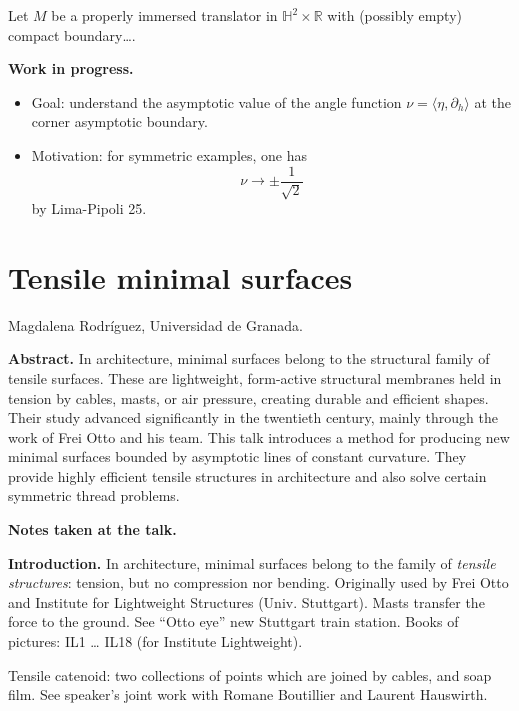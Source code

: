 \begin{theorem}
\label{theorem-pdst25}
Let $M$ be a properly immersed translator in
$\mathbb{H}^2 \times \mathbb{R}$ with
(possibly empty) compact boundary….
\end{theorem}


\medskip\noindent
{\bf Work in progress.}

\begin{itemize}
\item Goal: understand the asymptotic value
of the angle function $\nu =
\langle\eta,\partial_h\rangle$ at the corner
asymptotic boundary.
\item Motivation: for symmetric examples,
one has
$$
\nu \to \pm \frac{1}{\sqrt{2}}
$$
by Lima-Pipoli 25.
\end{itemize}

\section{Tensile minimal surfaces}
\label{section-tensile-minimal-surfaces}

\medskip\noindent
Magdalena Rodr\'iguez,
Universidad de Granada.

\medskip\noindent
{\bf Abstract.}
In architecture, minimal surfaces belong
to the structural family of tensile
surfaces. These are lightweight,
form-active structural membranes held in
tension by cables, masts, or air pressure,
creating durable and efficient shapes.
Their study advanced significantly in the
twentieth century, mainly through the work
of Frei Otto and his team. This talk
introduces a method for producing new
minimal surfaces bounded by asymptotic
lines of constant curvature. They provide
highly efficient tensile structures in
architecture and also solve certain
symmetric thread problems.

\medskip\noindent
{\bf Notes taken at the talk.}

\medskip\noindent
{\bf Introduction.}
In architecture, minimal surfaces
belong to the family of {\it tensile
structures}: tension, but no compression
nor bending. Originally used by Frei Otto
and Institute for Lightweight Structures
(Univ. Stuttgart). Masts transfer the
force to the ground. See ``Otto eye''
new Stuttgart train station. Books of
pictures: IL1 … IL18 (for Institute
Lightweight).

Tensile catenoid: two collections of points
which are joined by cables, and soap film.
See speaker's joint work with Romane
Boutillier and Laurent Hauswirth.

